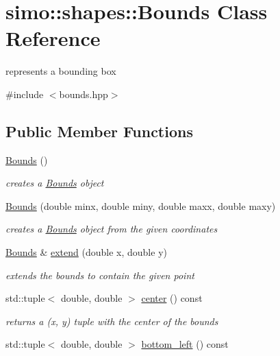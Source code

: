 \hypertarget{classsimo_1_1shapes_1_1_bounds}{\section{simo\-:\-:shapes\-:\-:Bounds Class Reference}
\label{classsimo_1_1shapes_1_1_bounds}
}


represents a bounding box  




{\ttfamily \#include $<$bounds.\-hpp$>$}

\subsection*{Public Member Functions}
\begin{DoxyCompactItemize}
\item 
\hyperlink{classsimo_1_1shapes_1_1_bounds_a315d14b06ca14cedf66045bd1024e858}{Bounds} ()
\begin{DoxyCompactList}\small\item\em creates a \hyperlink{classsimo_1_1shapes_1_1_bounds}{Bounds} object \end{DoxyCompactList}\item 
\hyperlink{classsimo_1_1shapes_1_1_bounds_ab7c7ea30c937558080e14f79ea5fa689}{Bounds} (double minx, double miny, double maxx, double maxy)
\begin{DoxyCompactList}\small\item\em creates a \hyperlink{classsimo_1_1shapes_1_1_bounds}{Bounds} object from the given coordinates \end{DoxyCompactList}\item 
\hyperlink{classsimo_1_1shapes_1_1_bounds}{Bounds} \& \hyperlink{classsimo_1_1shapes_1_1_bounds_ad18b9c2175f6a8f4acf40ddeb643c990}{extend} (double x, double y)
\begin{DoxyCompactList}\small\item\em extends the bounds to contain the given point \end{DoxyCompactList}\item 
std\-::tuple$<$ double, double $>$ \hyperlink{classsimo_1_1shapes_1_1_bounds_abfde94e940053ba10343c6443f6a400d}{center} () const 
\begin{DoxyCompactList}\small\item\em returns a (x, y) tuple with the center of the bounds \end{DoxyCompactList}\item 
std\-::tuple$<$ double, double $>$ \hyperlink{classsimo_1_1shapes_1_1_bounds_a88f735d084ffa6d7ea3dd84fadbc1a17}{bottom\-\_\-left} () const 

\end{DoxyCompactItemize}
